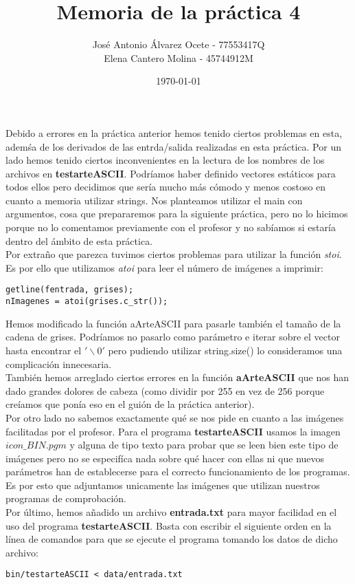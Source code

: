 \documentclass[11pt,a4paper]{article}
\title{Memoria de la práctica 4}
\author{José Antonio Álvarez Ocete - 77553417Q\\Elena Cantero Molina - 45744912M}
\date{\today}
\newcommand\tab[1][1cm]{\hspace*{#1}}
\begin{document}
\maketitle

\tab Debido a errores en la práctica anterior hemos tenido ciertos problemas en esta, ademśa de los derivados de las entrda/salida realizadas en esta práctica. Por un lado hemos tenido ciertos inconvenientes en la lectura de los nombres de los archivos en \textbf{testarteASCII}. Podríamos haber definido vectores estáticos para todos ellos pero decidimos que sería mucho más cómodo y menos costoso en cuanto a memoria utilizar strings. Nos planteamos utilizar el main con argumentos, cosa que prepararemos para la siguiente práctica, pero no lo hicimos porque no lo comentamos previamente con el profesor y no sabíamos si estaría dentro del ámbito de esta práctica. \\

\tab Por extraño que parezca tuvimos ciertos problemas para utilizar la función \emph{stoi}. Es por ello que utilizamos \emph{atoi} para leer el número de imágenes a imprimir: 

\begin{verbatim} 
getline(fentrada, grises);
nImagenes = atoi(grises.c_str());
\end{verbatim}

\tab Hemos modificado la función aArteASCII para pasarle también el tamaño de la cadena de grises. Podríamos no pasarlo como parámetro e iterar sobre el vector hasta encontrar el \textbf{$'\backslash0'$} pero pudiendo utilizar string.size() lo consideramos una complicación innecesaria. \\

\tab También hemos arreglado ciertos errores en la función \textbf{aArteASCII} que nos han dado grandes dolores de cabeza (como dividir por 255 en vez de 256 porque creíamos que ponía eso en el guión de la práctica anterior). \\

\tab Por otro lado no sabemos exactamente qué se nos pide en cuanto a las imágenes facilitadas por el profesor. Para el programa \textbf{testarteASCII} usamos la imagen $icon\_BIN.pgm$ y alguna de tipo texto para probar que se leen bien este tipo de imágenes pero no se especifíca nada sobre qué hacer con ellas ni que nuevos parámetros han de establecerse para el correcto funcionamiento de los programas. Es por esto que adjuntamos unicamente las imágenes que utilizan nuestros programas de comprobación. \\

\tab Por último, hemos añadido un archivo \textbf{entrada.txt} para mayor facilidad en el uso del programa \textbf{testarteASCII}. Basta con escribir el siguiente orden en la línea de comandos para que se ejecute el programa tomando los datos de dicho archivo:

\begin{verbatim} 
bin/testarteASCII < data/entrada.txt
\end{verbatim}
\end{document}
